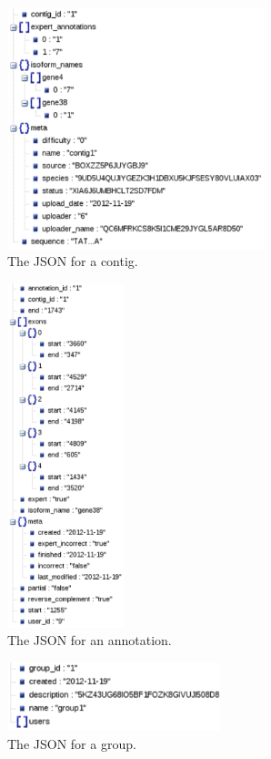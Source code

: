 \documentclass[]{IEEEtran}
\begin{document}
\begin{figure}%
	\includegraphics[height=70mm]{contig.eps}
         \caption{The JSON for a contig.}
         \label{fig:JSON-contig}
\end{figure}%

\begin{figure}%
	\includegraphics[height=100mm]{annotation.eps}
	\caption{The JSON for an annotation.}
	\label{fig:JSON-annotation}
\end{figure}%

\begin{figure}%
	\includegraphics[height=20mm]{group.eps}
	\caption{The JSON for a group.}
	\label{fig:JSON-group}
\end{figure}%
\end{document}

